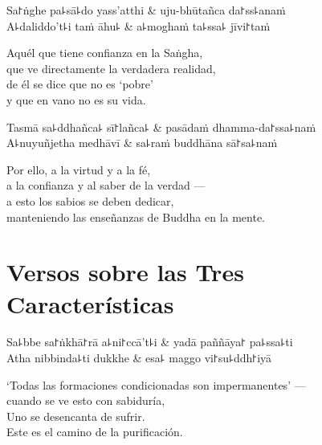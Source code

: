 \begin{twochants}
  Sa꜓ṅghe pa꜕sā꜕do yass'atthi & uju-bhūtañca da꜓ss꜕anaṁ \\
  A꜕daliddo't꜕i taṁ āhu꜕ & a꜕moghaṁ ta꜕ssa꜕ jīvi꜓taṁ \\
\end{twochants}

\begin{english}
  Aquél que tiene confianza en la Saṅgha,\\
  que ve directamente la verdadera realidad,\\
  de él se dice que no es `pobre'\\
  y que en vano no es su vida.
\end{english}

\begin{twochants}
  Tasmā sa꜕ddhañca꜕ sī꜓lañca꜕ & pasādaṁ dhamma-da꜓ssa꜕naṁ \\
  A꜕nuyuñjetha medhāvī & sa꜕raṁ buddhāna sā꜓sa꜕naṁ \\
\end{twochants}

\begin{english}
  Por ello, a la virtud y a la fé,\\
  a la confianza y al saber de la verdad ---\\
  a esto los sabios se deben dedicar,\\
  manteniendo las enseñanzas de Buddha en la mente.
\end{english}

\chapter{Versos sobre las Tres Características}


\begin{leader}
\end{leader}

\begin{twochants}
  Sa꜕bbe sa꜓ṅkhā꜓rā a꜕ni꜓ccā't꜕i & yadā paññāya꜓ pa꜕ssa꜕ti \\
  Atha nibbinda꜕ti dukkhe & esa꜕ maggo vi꜓su꜕ddh꜓iyā \\
\end{twochants}

\begin{english}
  `Todas las formaciones condicionadas son impermanentes' ---\\
  cuando se ve esto con sabiduría,\\
  Uno se desencanta de sufrir.\\
  Este es el camino de la purificación.
\end{english}

